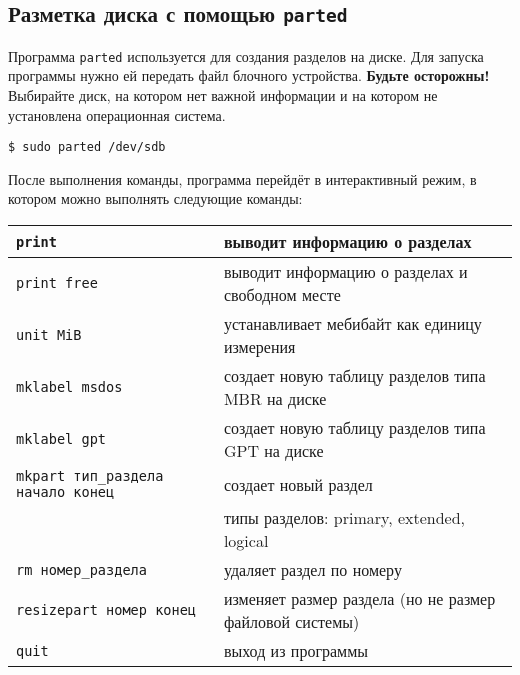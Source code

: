 \documentclass[10pt]{article}
\begin{document}
\subsection*{Разметка диска с помощью \texttt{parted}}
Программа \texttt{parted} используется для создания разделов на диске. Для запуска программы нужно ей передать файл блочного устройства. \textbf{Будьте осторожны!} Выбирайте диск, на котором нет важной информации и на котором не установлена операционная система.
\begin{lstlisting}
$ sudo parted /dev/sdb
\end{lstlisting}
После выполнения команды, программа перейдёт в интерактивный режим, в котором можно выполнять следующие команды:
\begin{flushleft}
\begin{tabular}{ p{6cm} | l }
 \texttt{print} & выводит информацию о разделах  \\ \hline
 \texttt{print free} & выводит информацию о разделах и свободном месте  \\ \hline
 \texttt{unit MiB} & устанавливает мебибайт как единицу измерения  \\ \hline
 \texttt{mklabel msdos} & создает новую таблицу разделов типа MBR на диске  \\ \hline
 \texttt{mklabel gpt} & создает новую таблицу разделов типа GPT на диске  \\ \hline
 \texttt{mkpart тип\_раздела начало конец} & создает новый раздел  \\ 
 								  & типы разделов: primary, extended, logical  \\ \hline
 \texttt{rm номер\_раздела}		  & удаляет раздел по номеру \\ \hline
 \texttt{resizepart номер конец}  & изменяет размер раздела (но не размер файловой системы) \\ \hline
 \texttt{quit}                    & выход из программы
\end{tabular}
\end{flushleft}
\end{document}
